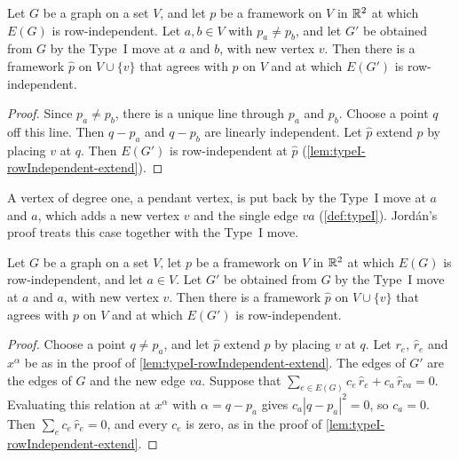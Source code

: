 \begin{lemma}
  \label{lem:typeI-rowIndependent-lift}
  \leanok
  Let $G$ be a graph on a set $V$, and let $p$ be a framework on
  $V$ in ${\mathbb{R}}^{2}$ at which $E(G)$ is row-independent. Let $a, b \in V$
  with $p_a \ne p_b$, and let $G'$ be obtained from $G$ by the Type~I
  move at $a$ and $b$, with new vertex $v$. Then there is a framework
  $\hat p$ on $V \cup \{v\}$ that agrees with $p$ on $V$ and at which
  $E(G')$ is row-independent.
\end{lemma}
\begin{proof}
  \leanok
  Since $p_a \ne p_b$, there is a unique line through $p_a$ and $p_b$.
  Choose a point $q$ off this line. Then
  $q - p_a$ and $q - p_b$ are linearly independent. Let $\hat p$ extend
  $p$ by placing $v$ at $q$. Then $E(G')$ is row-independent at
  $\hat p$ (\cref{lem:typeI-rowIndependent-extend}).
\end{proof}

A vertex of degree one, a pendant vertex, is put back by the Type~I
move at $a$ and $a$, which adds a new vertex $v$ and the single edge
$va$ (\cref{def:typeI}). Jord\'an's proof treats this case together
with the Type~I move.

\begin{lemma}
  \label{lem:pendant-rowIndependent-lift}
  \leanok
  Let $G$ be a graph on a set $V$, let $p$ be a framework on $V$
  in ${\mathbb{R}}^{2}$ at which $E(G)$ is row-independent, and let $a \in V$.
  Let $G'$ be obtained from $G$ by the Type~I move at $a$ and $a$, with
  new vertex $v$. Then there is a framework $\hat p$ on $V \cup \{v\}$
  that agrees with $p$ on $V$ and at which $E(G')$ is row-independent.
\end{lemma}
\begin{proof}
  \leanok
  Choose a point $q \ne p_a$, and let $\hat p$ extend $p$ by placing
  $v$ at $q$. Let $r_e$, $\hat r_e$ and $x^{\alpha}$ be as in the proof
  of \cref{lem:typeI-rowIndependent-extend}. The edges of $G'$ are the
  edges of $G$ and the new edge $va$. Suppose that
  $\sum_{e \in E(G)} c_e\, \hat r_e + c_a\, \hat r_{va} = 0$.
  Evaluating this relation at $x^{\alpha}$ with $\alpha = q - p_a$
  gives $c_a |q - p_a|^{2} = 0$, so $c_a = 0$. Then
  $\sum_e c_e\, \hat r_e = 0$, and every $c_e$ is zero, as in the proof
  of \cref{lem:typeI-rowIndependent-extend}.
\end{proof}

